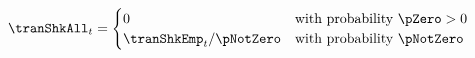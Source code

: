   \begin{equation}
    \tranShkAll_{t}=
    \begin{cases}
      0\phantom{_{t+1}/\pNotZero} & \text{with probability $\pZero > 0$} \\
      \tranShkEmp_{t}/\pNotZero      & \text{with probability $\pNotZero  $} %
    \end{cases} \label{eq:TranShkDef}
  \end{equation}
